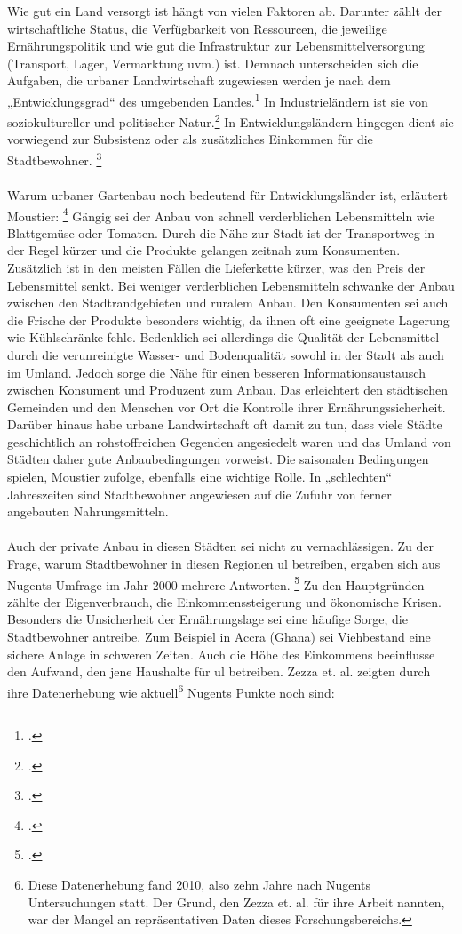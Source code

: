 \documentclass{scrartcl}
\begin{document}
Wie gut ein Land versorgt ist hängt von vielen Faktoren ab. Darunter zählt der wirtschaftliche Status, die Verfügbarkeit von Ressourcen, die jeweilige Ernährungspolitik und wie gut die Infrastruktur zur Lebensmittelversorgung (Transport, Lager, Vermarktung uvm.) ist. Demnach unterscheiden sich die Aufgaben, die urbaner Landwirtschaft zugewiesen werden je nach dem „Entwicklungsgrad“ des umgebenden Landes.\footcite{Smit2001UrbanToday} In Industrieländern ist sie von soziokultureller und politischer Natur.\footcites[][S. 21]{Berges2014UrbaneStadt}[S.26f]{Smit2001UrbanToday} In Entwicklungsländern hingegen dient sie vorwiegend zur Subsistenz oder als zusätzliches Einkommen für die Stadtbewohner. \footcites[Vgl.][S.75]{Nugent2000TheEconomies}[S.26f]{Smit2001UrbanToday}\\
\\
Warum urbaner Gartenbau noch bedeutend für Entwicklungsländer ist, erläutert Moustier: \footcites[Vgl.][S.6ff]{Moustier2007UrbanSupplier} Gängig sei der Anbau von schnell verderblichen Lebensmitteln wie Blattgemüse oder Tomaten. Durch die Nähe zur Stadt ist der Transportweg in der Regel kürzer und die Produkte gelangen zeitnah zum Konsumenten. Zusätzlich ist in den meisten Fällen die Lieferkette kürzer, was den Preis der Lebensmittel senkt. Bei weniger verderblichen Lebensmitteln schwanke der Anbau zwischen den Stadtrandgebieten und ruralem Anbau. Den Konsumenten sei auch die Frische der Produkte besonders wichtig, da ihnen oft eine geeignete Lagerung wie Kühlschränke fehle. Bedenklich sei allerdings die Qualität der Lebensmittel durch die verunreinigte Wasser- und Bodenqualität sowohl in der Stadt als auch im Umland. Jedoch sorge die Nähe für einen besseren Informationsaustausch zwischen Konsument und Produzent zum Anbau. Das erleichtert den städtischen Gemeinden und den Menschen vor Ort die Kontrolle ihrer Ernährungssicherheit. Darüber hinaus habe urbane Landwirtschaft oft damit zu tun, dass viele Städte geschichtlich an rohstoffreichen Gegenden angesiedelt waren und das Umland von Städten daher gute Anbaubedingungen vorweist. Die saisonalen Bedingungen spielen, Moustier zufolge, ebenfalls eine wichtige Rolle. In „schlechten“ Jahreszeiten sind Stadtbewohner angewiesen auf die Zufuhr von ferner angebauten Nahrungsmitteln. \\
\\
Auch der private Anbau in diesen Städten sei nicht zu vernachlässigen. Zu der Frage, warum Stadtbewohner in diesen Regionen \acs{ul} betreiben, ergaben sich aus Nugents Umfrage im Jahr 2000 mehrere Antworten. \footcite[Vgl.][S.74]{Nugent2000TheEconomies} Zu den Hauptgründen zählte der Eigenverbrauch, die Einkommenssteigerung und ökonomische Krisen. Besonders die Unsicherheit der Ernährungslage sei eine häufige Sorge, die Stadtbewohner antreibe. Zum Beispiel in Accra (Ghana) sei Viehbestand eine sichere Anlage in schweren Zeiten. Auch die Höhe des Einkommens beeinflusse den Aufwand, den jene Haushalte für \acs{ul} betreiben. Zezza et. al. zeigten durch ihre Datenerhebung wie aktuell\footnote{Diese Datenerhebung fand 2010, also zehn Jahre nach Nugents Untersuchungen statt. Der Grund, den Zezza et. al. für ihre Arbeit nannten, war der Mangel an repräsentativen Daten dieses Forschungsbereichs.} Nugents Punkte noch sind:
\end{document}
